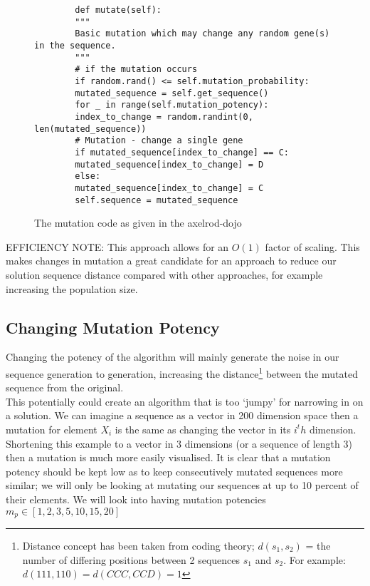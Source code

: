 \begin{figure}
    \begin{verbatim}
        def mutate(self):
        """
        Basic mutation which may change any random gene(s) in the sequence.
        """
        # if the mutation occurs
        if random.rand() <= self.mutation_probability:
        mutated_sequence = self.get_sequence()
        for _ in range(self.mutation_potency):
        index_to_change = random.randint(0, len(mutated_sequence))
        # Mutation - change a single gene
        if mutated_sequence[index_to_change] == C:
        mutated_sequence[index_to_change] = D
        else:
        mutated_sequence[index_to_change] = C
        self.sequence = mutated_sequence
    \end{verbatim}
    \caption{The mutation code as given in the axelrod-dojo}\label{code:mutateFromDojo}
\end{figure}

EFFICIENCY NOTE\@: This approach allows for an \(O(1)\) factor of scaling.
This makes changes in mutation a great candidate for an approach to reduce our solution sequence distance compared with other approaches, for example increasing the population size.\\

\subsection{Changing Mutation Potency}\label{subsec:changingMutationPotency}
Changing the potency of the algorithm will mainly generate the noise in our sequence generation to generation, increasing the distance\footnote{Distance concept has been taken from coding theory; \(d(s_1,s_2)\) = the number of differing positions between 2 sequences \(s_1\) and \(s_2\).
For example: \(d(111,110) = d(CCC,CCD) = 1 \)} between the mutated sequence from the original.\\

This potentially could create an algorithm that is too `jumpy' for narrowing in on a solution.
We can imagine a sequence as a vector in 200 dimension space then a mutation for element \(X_i\) is the same as changing the vector in its \(i^th\) dimension.
Shortening this example to a vector in 3 dimensions (or a sequence of length 3) then a mutation is much more easily visualised.
It is clear that a mutation potency should be kept low as to keep consecutively mutated sequences more similar;
we will only be looking at mutating our sequences at up to 10 percent of their elements.
We will look into having mutation potencies \(m_p \in [1,2,3,5,10,15,20]\)\\

